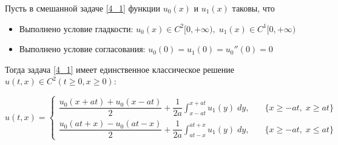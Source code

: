 \documentclass[../main.tex]{subfiles}
\begin{document}
\begin{theorem}
    Пусть в смешанной задаче \ref{4_1} функции $u_0(x)$ и $u_1(x)$ таковы, что 
    \begin{itemize}
        \item Выполнено условие гладкости: $u_0(x)\in C^2[0, +\infty), \; u_1(x) \in C^1[0, +\infty)$
        \item Выполнено условие согласования: $u_0(0) = u_1(0) = u_0''(0) = 0$
    \end{itemize}
    Тогда задача \ref{4_1} имеет единственное классическое решение $u(t,x) \in C^2(t \geq 0, x\geq 0)\colon$
\end{theorem}
\begin{equation} \label{4_2}
    u(t, x) = \begin{cases}
        \dfrac{u_0(x+at) + u_0(x-at)}{2} + \dfrac{1}{2a}\displaystyle\int_{x-at}^{x+at}u_1(y)\;dy,\quad & \{x\geq -at,\; x\geq at\} \\[1em]

        \dfrac{u_0(at+x) - u_0(at-x)}{2} + \dfrac{1}{2a}\displaystyle\int_{at-x}^{at+x}u_1(y)\;dy,\quad & \{x\geq -at,\; x\leq at\}
    \end{cases}
\end{equation}
\end{document}
